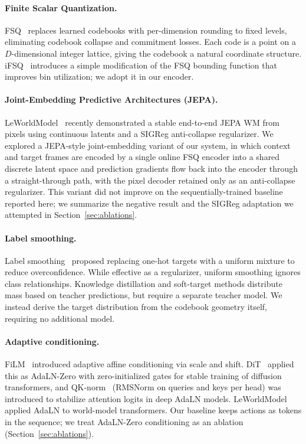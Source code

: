 \documentclass{article}
\begin{document}
\paragraph{Finite Scalar Quantization.}
FSQ~\citep{mentzer2024fsq} replaces learned codebooks with per-dimension rounding to fixed levels, eliminating codebook collapse and commitment losses.
Each code is a point on a $D$-dimensional integer lattice, giving the codebook a natural coordinate structure.
iFSQ~\citep{vali2026ifsq} introduces a simple modification of the FSQ bounding function that improves bin utilization; we adopt it in our encoder.

\paragraph{Joint-Embedding Predictive Architectures (JEPA).}
LeWorldModel~\citep{maes2026leworldmodel} recently demonstrated a stable end-to-end JEPA WM from pixels using continuous latents and a SIGReg anti-collapse regularizer.
We explored a JEPA-style joint-embedding variant of our system, in which context and target frames are encoded by a single online FSQ encoder into a shared discrete latent space and prediction gradients flow back into the encoder through a straight-through path, with the pixel decoder retained only as an anti-collapse regularizer.
This variant did not improve on the sequentially-trained baseline reported here; we summarize the negative result and the SIGReg adaptation we attempted in Section~\ref{sec:ablations}.

\paragraph{Label smoothing.}
Label smoothing~\citep{szegedy2016rethinking} proposed replacing one-hot targets with a uniform mixture to reduce overconfidence.
While effective as a regularizer, uniform smoothing ignores class relationships.
Knowledge distillation and soft-target methods distribute mass based on teacher predictions, but require a separate teacher model.
We instead derive the target distribution from the codebook geometry itself, requiring no additional model.

\paragraph{Adaptive conditioning.}
FiLM~\citep{perez2018film} introduced adaptive affine conditioning via scale and shift.
DiT~\citep{peebles2023dit} applied this as AdaLN-Zero with zero-initialized gates for stable training of diffusion transformers, and QK-norm~\citep{esser2024sd3} (RMSNorm on queries and keys per head) was introduced to stabilize attention logits in deep AdaLN models.
LeWorldModel~\citep{maes2026leworldmodel} applied AdaLN to world-model transformers.
Our baseline keeps actions as tokens in the sequence; we treat AdaLN-Zero conditioning as an ablation (Section~\ref{sec:ablations}).
\end{document}
